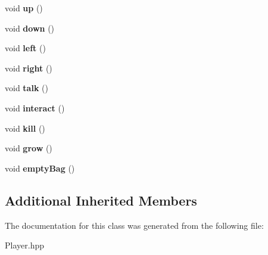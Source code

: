 \begin{DoxyCompactItemize}
\item 
\mbox{\label{class_player_a468bd0522874d230b8c775cbd21d04cb}} 
void {\bfseries up} ()
\item 
\mbox{\label{class_player_a0d83887d9c3df0cf823a7f347c002229}} 
void {\bfseries down} ()
\item 
\mbox{\label{class_player_a243cc6cba980b5c8399114c0a64ddcf7}} 
void {\bfseries left} ()
\item 
\mbox{\label{class_player_adeb847fac06de410e660143fee16e16d}} 
void {\bfseries right} ()
\item 
\mbox{\label{class_player_ab4b53920da0f0d0535cdee8038602006}} 
void {\bfseries talk} ()
\item 
\mbox{\label{class_player_a10bc8c26a58ca8c85cc1289b7817ff27}} 
void {\bfseries interact} ()
\item 
\mbox{\label{class_player_ab5d570eef42811790ef64f4acb88368a}} 
void {\bfseries kill} ()
\item 
\mbox{\label{class_player_a88055637b6065fc4294ad555ebb3071b}} 
void {\bfseries grow} ()
\item 
\mbox{\label{class_player_a753c4b0c4f7b2e06513a6190a82b1ba7}} 
void {\bfseries empty\+Bag} ()
\end{DoxyCompactItemize}
\subsection*{Additional Inherited Members}


The documentation for this class was generated from the following file\+:\begin{DoxyCompactItemize}
\item 
Player.\+hpp\end{DoxyCompactItemize}
